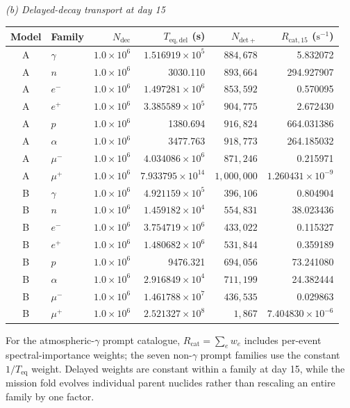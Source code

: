 \documentclass[11pt]{article}
\begin{document}
\begin{table}[!htbp]
\vspace{0.45em}
\noindent\textit{(b) Delayed-decay transport at day 15}\par\vspace{0.20em}
\begin{tabular}{clrrrr}
\toprule
Model & Family & $N_{\mathrm{dec}}$ & $T_{\mathrm{eq,del}}$ (s)
& $N_{\mathrm{det+}}$ & $R_{\mathrm{cat},15}$ ($\mathrm{s^{-1}}$) \\
\midrule
A & $\gamma$ & $1.0\times10^6$ & $1.516919\times10^5$ & $884{,}678$ & 5.832072 \\
A & $n$ & $1.0\times10^6$ & 3030.110 & $893{,}664$ & 294.927907 \\
A & $e^-$ & $1.0\times10^6$ & $1.497281\times10^6$ & $853{,}592$ & 0.570095 \\
A & $e^+$ & $1.0\times10^6$ & $3.385589\times10^5$ & $904{,}775$ & 2.672430 \\
A & $p$ & $1.0\times10^6$ & 1380.694 & $916{,}824$ & 664.031386 \\
A & $\alpha$ & $1.0\times10^6$ & 3477.763 & $918{,}773$ & 264.185032 \\
A & $\mu^-$ & $1.0\times10^6$ & $4.034086\times10^6$ & $871{,}246$ & 0.215971 \\
A & $\mu^+$ & $1.0\times10^6$ & $7.933795\times10^{14}$ & $1{,}000{,}000$ & $1.260431\times10^{-9}$ \\
\addlinespace[0.25em]
B & $\gamma$ & $1.0\times10^6$ & $4.921159\times10^5$ & $396{,}106$ & 0.804904 \\
B & $n$ & $1.0\times10^6$ & $1.459182\times10^4$ & $554{,}831$ & 38.023436 \\
B & $e^-$ & $1.0\times10^6$ & $3.754719\times10^6$ & $433{,}022$ & 0.115327 \\
B & $e^+$ & $1.0\times10^6$ & $1.480682\times10^6$ & $531{,}844$ & 0.359189 \\
B & $p$ & $1.0\times10^6$ & 9476.321 & $694{,}056$ & 73.241080 \\
B & $\alpha$ & $1.0\times10^6$ & $2.916849\times10^4$ & $711{,}199$ & 24.382444 \\
B & $\mu^-$ & $1.0\times10^6$ & $1.461788\times10^7$ & $436{,}535$ & 0.029863 \\
B & $\mu^+$ & $1.0\times10^6$ & $2.521327\times10^8$ & $1{,}867$ & $7.404830\times10^{-6}$ \\
\bottomrule
\end{tabular}

\vspace{0.35em}
\parbox{0.97\linewidth}{\raggedright For the atmospheric-$\gamma$ prompt
catalogue, $R_{\mathrm{cat}}=\sum_e w_e$ includes per-event spectral-importance
weights; the seven non-$\gamma$ prompt families use the constant
$1/T_{\mathrm{eq}}$ weight. Delayed weights are constant within a family at day
15, while the mission fold evolves individual parent nuclides rather than
rescaling an entire family by one factor.}
\end{table}
\endgroup
\end{document}

